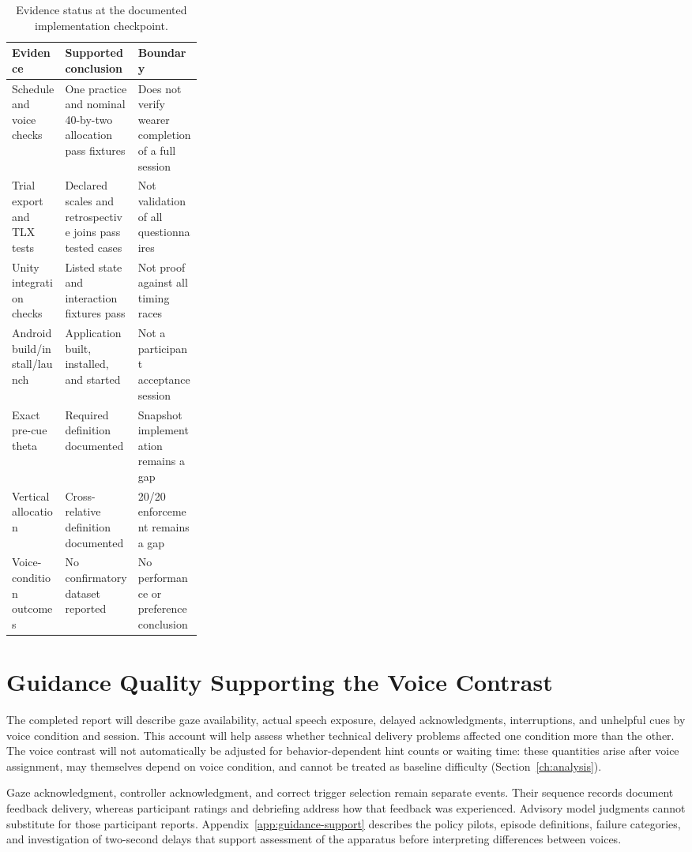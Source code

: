 \begin{table}[htbp]
\centering\caption{Evidence status at the documented implementation checkpoint.}
\small{}
\begin{tabularx}{\linewidth}{@{}p{0.28\linewidth}XX@{}}\toprule
Evidence & Supported conclusion & Boundary \\\midrule
Schedule and voice checks & One practice and nominal 40-by-two allocation pass fixtures & Does not verify wearer completion of a full session \\
Trial export and TLX tests & Declared scales and retrospective joins pass tested cases & Not validation of all questionnaires \\
Unity integration checks & Listed state and interaction fixtures pass & Not proof against all timing races \\
Android build/install/launch & Application built, installed, and started & Not a participant acceptance session \\
Exact pre-cue theta & Required definition documented & Snapshot implementation remains a gap \\
Vertical allocation & Cross-relative definition documented & 20/20 enforcement remains a gap \\
Voice-condition outcomes & No confirmatory dataset reported & No performance or preference conclusion \\\bottomrule
\end{tabularx}
\end{table}


\section{Guidance Quality Supporting the Voice Contrast}
The completed report will describe gaze availability, actual speech exposure, delayed acknowledgments, interruptions, and unhelpful cues by voice condition and session. This account will help assess whether technical delivery problems affected one condition more than the other. The voice contrast will not automatically be adjusted for behavior-dependent hint counts or waiting time: these quantities arise after voice assignment, may themselves depend on voice condition, and cannot be treated as baseline difficulty (Section~\ref{ch:analysis}).

Gaze acknowledgment, controller acknowledgment, and correct trigger selection remain separate events. Their sequence records document feedback delivery, whereas participant ratings and debriefing address how that feedback was experienced. Advisory model judgments cannot substitute for those participant reports. Appendix~\ref{app:guidance-support} describes the policy pilots, episode definitions, failure categories, and investigation of two-second delays that support assessment of the apparatus before interpreting differences between voices.
